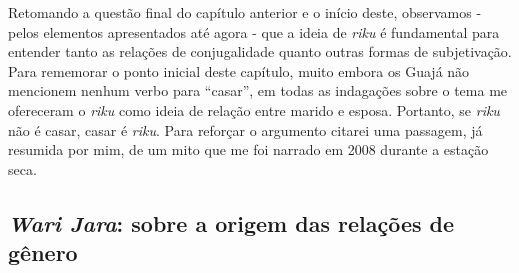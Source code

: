Retomando a questão final do capítulo anterior e o início deste,
observamos - pelos elementos apresentados até agora - que a ideia de
\emph{riku} é fundamental para entender tanto as relações de
conjugalidade quanto outras formas de subjetivação. Para rememorar o
ponto inicial deste capítulo, muito embora os Guajá não mencionem nenhum
verbo para ``casar'', em todas as indagações sobre o tema me ofereceram
o \emph{riku} como ideia de relação entre marido e esposa. Portanto, se
\emph{riku} não é casar, casar é \emph{riku}. Para reforçar o argumento
citarei uma passagem, já resumida por mim, de um mito que me foi narrado
em 2008 durante a estação seca.

\subsection{\emph{Wari Jara}: sobre a origem das relações de gênero}

